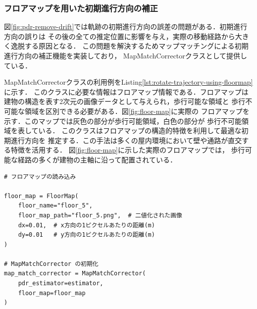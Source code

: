 

\subsubsection{フロアマップを用いた初期進行方向の補正}

図\ref{fig:pdr-remove-drift}では軌跡の初期進行方向の誤差の問題がある．初期進行方向の誤りは
その後の全ての推定位置に影響を与え，実際の移動経路から大きく逸脱する原因となる．
この問題を解決するためマップマッチングによる初期進行方向の補正機能を実装しており，
MapMatchCorrectorクラスとして提供している．

MapMatchCorrectorクラスの利用例をListing\ref{lst:rotate-trajectory-using-floormap}に示す．
このクラスに必要な情報はフロアマップ情報である．フロアマップは
建物の構造を表す2次元の画像データとして与えられ，歩行可能な領域と
歩行不可能な領域を区別できる必要がある．図\ref{fig:floor-map}に実際の
フロアマップを示す．このマップでは灰色の部分が歩行可能領域，白色の部分が
歩行不可能領域を表している．
このクラスはフロアマップの構造的特徴を利用して最適な初期進行方向を
推定する．この手法は多くの屋内環境において壁や通路が直交する特徴を活用する．
図\ref{fig:floor-map}に示した実際のフロアマップでは，
歩行可能な経路の多くが建物の主軸に沿って配置されている．

\begin{lstlisting}[caption={MapMatchCorrectorの使用例},label=lst:rotate-trajectory-using-floormap,float=ht]
# フロアマップの読み込み

floor_map = FloorMap(
    floor_name="floor_5",
    floor_map_path="floor_5.png",  # 二値化された画像
    dx=0.01,  # x方向の1ピクセルあたりの距離(m)
    dy=0.01   # y方向の1ピクセルあたりの距離(m)
)

# MapMatchCorrector の初期化
map_match_corrector = MapMatchCorrector(
    pdr_estimator=estimator,
    floor_map=floor_map
)
\end{lstlisting}


